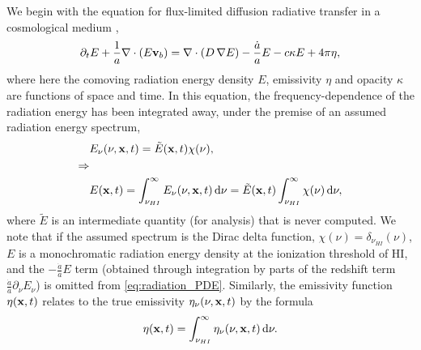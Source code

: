 \documentclass[letterpaper,10pt]{article}
\renewcommand{\(}{\left(}
\renewcommand{\)}{\right)}
\newcommand{\vb}{{\bf v}_b}
\newcommand{\xvec}{{\bf x}}
\begin{document}
We begin with the equation for flux-limited diffusion radiative
transfer in a cosmological medium \cite{ReynoldsHayesPaschosNorman2009},
\begin{equation}
\label{eq:radiation_PDE}
  \partial_{t} E + \frac1a \nabla\cdot\(E\vb\) =
    \nabla\cdot\(D\,\nabla E\) - \frac{\dot{a}}{a} E - c\kappa E + 4\pi\eta,
\end{equation}
where here the comoving radiation energy density $E$, emissivity
$\eta$ and opacity $\kappa$ are functions of space and time.  In this
equation, the frequency-dependence of the radiation energy has been
integrated away, under the premise of an assumed radiation energy
spectrum, 
\begin{align}
  \notag
  & E_{\nu}(\nu,\xvec,t) = \tilde{E}(\xvec,t) \chi(\nu), \\
  \notag
  \Rightarrow & \\
  \label{eq:spectrum}
  & E(\xvec,t) = \int_{\nu_{HI}}^{\infty} E_{\nu}(\nu,\xvec,t)\,\mathrm{d}\nu 
    = \tilde{E}(\xvec,t) \int_{\nu_{HI}}^{\infty} \chi(\nu)\,\mathrm{d}\nu,
\end{align}
where $\tilde{E}$ is an intermediate quantity (for analysis) that is
never computed.  We note that if the assumed spectrum is the Dirac
delta function, $\chi(\nu) = \delta_{\nu_{HI}}(\nu)$, $E$ is a
monochromatic radiation energy density at the ionization threshold of
HI, and the $-\frac{\dot{a}}{a}E$ term (obtained through integration
by parts of the redshift term
$\frac{\dot{a}}{a}\partial_{\nu}E_{\nu}$) is omitted from
\eqref{eq:radiation_PDE}. Similarly, the emissivity function
$\eta(\xvec,t)$ relates to the true emissivity
$\eta_{\nu}(\nu,\xvec,t)$ by the formula
\begin{equation}
\label{eq:emissivity}
  \eta(\xvec,t) = \int_{\nu_{HI}}^{\infty}\eta_{\nu}(\nu,\xvec,t)\,\mathrm{d}\nu.
\end{equation}
\end{document}
